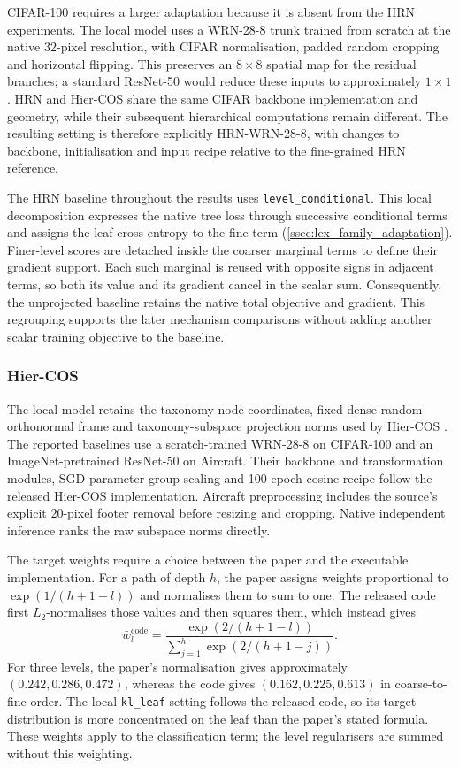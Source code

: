 CIFAR-100 requires a larger adaptation because it is absent from the HRN
experiments. The local model uses a WRN-28-8 trunk trained from scratch at the
native $32$-pixel resolution, with CIFAR normalisation, padded random cropping
and horizontal flipping. This preserves an $8\times8$ spatial map for the
residual branches; a standard ResNet-50 would reduce these inputs to
approximately $1\times1$. HRN and Hier-COS share the same CIFAR backbone
implementation and geometry, while their subsequent hierarchical computations
remain different. The resulting setting is therefore explicitly HRN-WRN-28-8,
with changes to backbone, initialisation and input recipe relative to the
fine-grained HRN reference.

The HRN baseline throughout the results uses \texttt{level\_conditional}.
This local decomposition expresses the native tree loss through successive
conditional terms and assigns the leaf cross-entropy to the fine term
(\cref{ssec:lex_family_adaptation}). Finer-level scores are detached inside
the coarser marginal terms to define their gradient support. Each such
marginal is reused with opposite signs in adjacent terms, so both its value
and its gradient cancel in the scalar sum. Consequently, the unprojected
baseline retains the native total objective and gradient. This regrouping
supports the later mechanism comparisons without adding another scalar
training objective to the baseline.

\subsubsection{Hier-COS}
\label{sssec:fidelity_hiercos}

The local model retains the taxonomy-node coordinates, fixed dense random
orthonormal frame and taxonomy-subspace projection norms used by Hier-COS
\cite{sani2025hiercos}. The reported baselines use a scratch-trained WRN-28-8
on CIFAR-100 and an ImageNet-pretrained ResNet-50 on Aircraft. Their backbone
and transformation modules, SGD parameter-group scaling and 100-epoch cosine
recipe follow the released Hier-COS implementation. Aircraft preprocessing
includes the source's explicit $20$-pixel footer removal before resizing and
cropping. Native independent inference ranks the raw subspace norms directly.

The target weights require a choice between the paper and the executable
implementation. For a path of depth $h$, the paper assigns weights
proportional to $\exp(1/(h+1-l))$ and normalises them to sum to one. The
released code first $L_2$-normalises those values and then squares them,
which instead gives
\[
\bar w_l^{\mathrm{code}}
=\frac{\exp(2/(h+1-l))}{\sum_{j=1}^{h}\exp(2/(h+1-j))}.
\]
For three levels, the paper's normalisation gives approximately
$(0.242,0.286,0.472)$, whereas the code gives $(0.162,0.225,0.613)$ in
coarse-to-fine order. The local \texttt{kl\_leaf} setting follows the released
code, so its target distribution is more concentrated on the leaf than the
paper's stated formula. These weights apply to the classification term;
the level regularisers are summed without this weighting.

